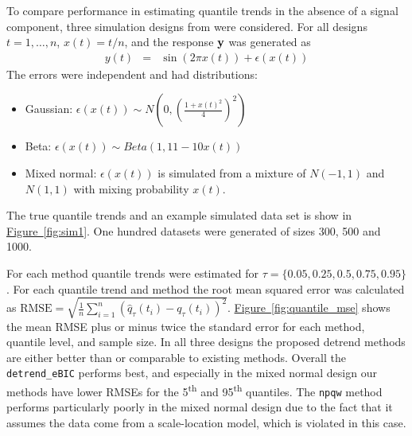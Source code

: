 \documentclass[aoas]{imsart}
\newcommand{\Fig}[1]{\hyperref[fig:#1]{Figure~\ref*{fig:#1}}} %
\newcommand{\Fig}[1]{{Figure~\ref{fig:#1}}} %
\newcommand{\V}[1]{{\bm{\mathbf{\MakeLowercase{#1}}}}} %
\begin{document}
To compare performance in estimating quantile trends in the absence of a signal component, three simulation designs from \cite{Racine2017} were considered. For all designs $t = 1, \ldots, n$,  $x(t) = t/n$, and the response $\V{y}$ was generated as
\begin{eqnarray*}
	y(t) & = & \sin(2\pi x(t)) + \epsilon(x(t))
\end{eqnarray*}
The errors were independent and had distributions:
\begin{itemize}
	\item Gaussian: $\epsilon(x(t)) \sim N\left(0, \left(\frac{1+x(t)^2}{4}\right)^2\right)$
	\item Beta: $\epsilon(x(t)) \sim Beta(1, 11-10x(t))$
	\item Mixed normal: $\epsilon(x(t))$ is simulated from a mixture of $N(-1,1)$ and  $N(1,1)$ with mixing probability $x(t)$.
\end{itemize}
The true quantile trends and an example simulated data set is show in \Fig{sim1}. One hundred datasets were generated of sizes 300, 500 and 1000. 

For each method quantile trends were estimated for $\tau = \{0.05, 0.25, 0.5, 0.75, 0.95\}$. For each quantile trend and method the root mean squared error was calculated as $\mbox{RMSE} = \sqrt{\frac{1}{n}\sum_{i=1}^n (\hat{q}_{\tau}(t_i) - q_\tau(t_i))^2}$. \Fig{quantile_mse} shows the mean RMSE plus or minus twice the standard error for each method, quantile level, and sample size. In all three designs the proposed detrend methods are either better than or comparable to existing methods. Overall the \texttt{detrend\_eBIC} performs best, and especially in the mixed normal design our methods have lower RMSEs for the 5\textsuperscript{th} and 95\textsuperscript{th} quantiles. The \texttt{npqw} method performs particularly poorly in the mixed normal design due to the fact that it assumes the data come from a scale-location model, which is violated in this case.
\end{document}
